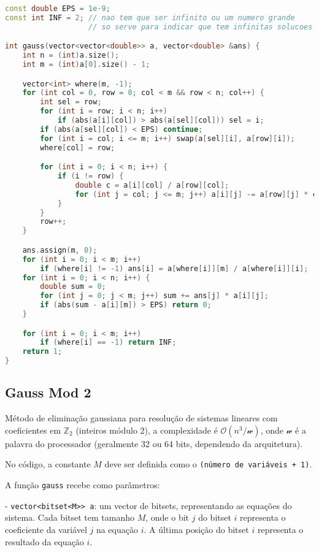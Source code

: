 \documentclass[10pt, a4paper, oneside]{book}
\begin{document}
\begin{lstlisting}[language=C++]
const double EPS = 1e-9;
const int INF = 2; // nao tem que ser infinito ou um numero grande
                   // so serve para indicar que tem infinitas solucoes

int gauss(vector<vector<double>> a, vector<double> &ans) {
    int n = (int)a.size();
    int m = (int)a[0].size() - 1;

    vector<int> where(m, -1);
    for (int col = 0, row = 0; col < m && row < n; col++) {
        int sel = row;
        for (int i = row; i < n; i++)
            if (abs(a[i][col]) > abs(a[sel][col])) sel = i;
        if (abs(a[sel][col]) < EPS) continue;
        for (int i = col; i <= m; i++) swap(a[sel][i], a[row][i]);
        where[col] = row;

        for (int i = 0; i < n; i++) {
            if (i != row) {
                double c = a[i][col] / a[row][col];
                for (int j = col; j <= m; j++) a[i][j] -= a[row][j] * c;
            }
        }
        row++;
    }

    ans.assign(m, 0);
    for (int i = 0; i < m; i++)
        if (where[i] != -1) ans[i] = a[where[i]][m] / a[where[i]][i];
    for (int i = 0; i < n; i++) {
        double sum = 0;
        for (int j = 0; j < m; j++) sum += ans[j] * a[i][j];
        if (abs(sum - a[i][m]) > EPS) return 0;
    }

    for (int i = 0; i < m; i++)
        if (where[i] == -1) return INF;
    return 1;
}
\end{lstlisting}
\hfill

\subsection{Gauss Mod 2}


Método de eliminação gaussiana para resolução de sistemas lineares com coeficientes em $\mathbb{Z}_2$ (inteiros módulo 2), a complexidade é $\mathcal{O}(n^3 / \mathcal{w})$, onde $\mathcal{w}$ é a palavra do processador (geralmente 32 ou 64 bits, dependendo da arquitetura).



No código, a constante $M$ deve ser definida como o \texttt{(número de variáveis + 1)}.



A função \texttt{gauss} recebe como parâmetros:

 - \texttt{vector<bitset<M>> a}: um vector de bitsets, representando as equações do sistema. Cada bitset tem tamanho $M$, onde o bit $j$ do bitset $i$ representa o coeficiente da variável $j$ na equação $i$. A última posição do bitset $i$ representa o resultado da equação $i$.
\end{document}
